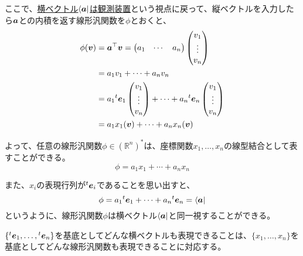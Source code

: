 \documentclass[../../../topic_linear-algebra]{subfiles}
\begin{document}
ここで、\hyperref[sec:inner-product-to-functional]{横ベクトル$\bra{\vb*{a}}$は観測装置}という視点に戻って、縦ベクトルを入力したら$\vb*{a}$との内積を返す線形汎関数を$\phi$とおくと、
\begin{align*}
  \phi(\vb*{v}) &= \vb*{a}^\top \vb*{v} = \begin{pmatrix}
    a_1 & \cdots & a_n
  \end{pmatrix}
  \begin{pmatrix}
    v_1 \\
    \vdots \\
    v_n
  \end{pmatrix} \\
  &= a_1 v_1 + \cdots + a_n v_n \\
  & = a_1 {}^t\vb*{e}_1 \begin{pmatrix}
                               v_1    \\
                               \vdots \\
                               v_n
                             \end{pmatrix} + \cdots + a_n {}^t\vb*{e}_n \begin{pmatrix}
                                                                          v_1    \\
                                                                          \vdots \\
                                                                          v_n
                                                                        \end{pmatrix} \\
       & = a_1 x_1(\vb*{v}) + \cdots + a_n x_n(\vb*{v})
\end{align*}

よって、任意の線形汎関数$\phi \in (\mathbb{R}^n)^*$は、座標関数$x_1,\dots,x_n$の線型結合として表すことができる。
\begin{equation*}
  \phi = a_1 x_1 + \cdots + a_n x_n
\end{equation*}

また、$x_i$の表現行列が${}^t \vb*{e}_i$であることを思い出すと、
\begin{equation*}
  \phi = a_1 {}^t\vb*{e}_1 + \cdots + a_n {}^t\vb*{e}_n = \bra{\vb*{a}}
\end{equation*}
というように、線形汎関数$\phi$は横ベクトル$\bra{\vb*{a}}$と同一視することができる。

\br

$\{ {}^t\vb*{e}_1, \ldots, {}^t\vb*{e}_n \}$を基底としてどんな横ベクトルも表現できることは、$\{ x_1, \ldots, x_n \}$を基底としてどんな線形汎関数も表現できることに対応する。
\end{document}
